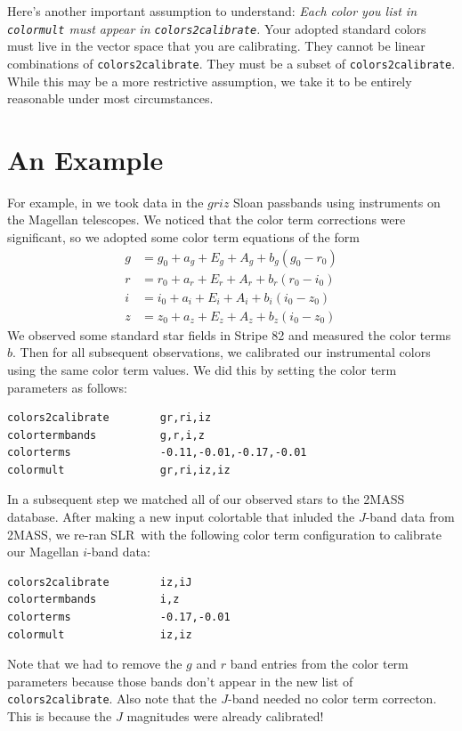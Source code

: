 \documentclass{report}
\newcommand{\slr}{SLR}
\begin{document}
Here's another important assumption to understand: {\it Each color you
  list in \verb|colormult| must appear in \verb|colors2calibrate|.}
Your adopted standard colors must live in the vector space that you
are calibrating.  They cannot be linear combinations of
\verb|colors2calibrate|.  They must be a subset of
\verb|colors2calibrate|.  While this may be a more restrictive
assumption, we take it to be entirely reasonable under most
circumstances.



\section{An Example}

For example, in \citet{bib:slr} we took data in the $griz$ Sloan
passbands using instruments on the Magellan telescopes.  We noticed
that the color term corrections were significant, so we adopted some
color term equations of the form
\begin{subequations} 
\begin{align}
  g & = g_0 + a_g + E_g + A_g + b_g(g_0-r_0) \\
  r & = r_0 + a_r + E_r + A_r + b_r(r_0-i_0) \\
  i & = i_0 + a_i + E_i + A_i + b_i(i_0-z_0) \\
  z & = z_0 + a_z + E_z + A_z + b_z(i_0-z_0)
\end{align} 
\end{subequations}
We observed some standard star fields in Stripe 82 and measured the
color terms $b$.  Then for all subsequent observations, we calibrated
our instrumental colors using the same color term values.  We did this
by setting the color term parameters as follows:
\begin{verbatim}
colors2calibrate        gr,ri,iz
colortermbands          g,r,i,z
colorterms              -0.11,-0.01,-0.17,-0.01
colormult               gr,ri,iz,iz
\end{verbatim}

In a subsequent step we matched all of our observed stars to the 2MASS
database.  After making a new input colortable that inluded the
$J$-band data from 2MASS, we re-ran \slr\ with the following color
term configuration to calibrate our Magellan $i$-band data:
\begin{verbatim}
colors2calibrate        iz,iJ
colortermbands          i,z
colorterms              -0.17,-0.01
colormult               iz,iz
\end{verbatim}
Note that we had to remove the $g$ and $r$ band entries from the color
term parameters because those bands don't appear in the new list of
\verb|colors2calibrate|.  Also note that the $J$-band needed no color
term correcton.  This is because the $J$ magnitudes were already
calibrated!
\end{document}
